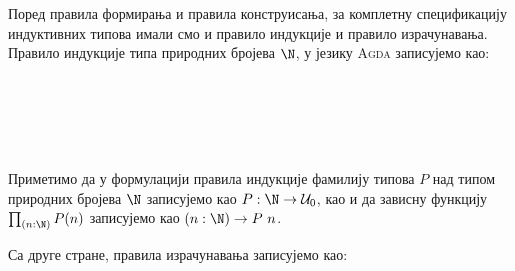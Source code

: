 Поред правила формирања и правила конструисања, за комплетну спецификацију индуктивних типова имали смо и правило индукције и правило израчунавања. Правило индукције типа природних бројева $\N$, у језику \textsc{Agda} записујемо као:
\begin{code} %
\>[0]%
\>[29I]\AgdaSymbol{:}\AgdaSpace{}%
\AgdaSymbol{(}\AgdaSpace{}%
\AgdaSymbol{:}\AgdaSpace{}%
\AgdaSpace{}%
\AgdaSpace{}%
\AgdaSpace{}%
\AgdaSpace{}%
\AgdaSymbol{)}\<%
\\
\>[.][@{}l@{}]\<[29I]%
\>[12]\AgdaSpace{}%
\AgdaSpace{}%
\<%
\\
%
\>[12]\AgdaSpace{}%
\AgdaSymbol{((}\AgdaSpace{}%
\AgdaSymbol{:}\AgdaSpace{}%
\AgdaSymbol{)}\AgdaSpace{}%
\AgdaSpace{}%
\AgdaSpace{}%
\AgdaSpace{}%
\AgdaSpace{}%
\AgdaSpace{}%
\AgdaSymbol{(}\AgdaSpace{}%
\AgdaSymbol{))}\<%
\\
%
\>[12]\AgdaSpace{}%
\AgdaSymbol{(}\AgdaSpace{}%
\AgdaSymbol{:}\AgdaSpace{}%
\AgdaSymbol{)}\AgdaSpace{}%
\AgdaSpace{}%
\AgdaSpace{}%
\<%
\\
\>[0]\<%
\end{code}

Приметимо да у формулацији правила индукције фамилију типова $P$ над типом природних бројева $\N$ записујемо као $P : \N \to \mathcal{U}_0$, као и да зависну функцију $\prod_{(n : \N)} P (n)$ записујемо као $(n : \N) \to P~n$.

Са друге стране, правила израчунавања записујемо као:
\begin{code}%
\>[0]\AgdaSpace{}%
\AgdaSpace{}%
\AgdaSpace{}%
\AgdaSpace{}%
%
\>[29]\AgdaSymbol{=}\AgdaSpace{}%
\<%
\\
\>[0]\AgdaSpace{}%
\AgdaSpace{}%
\AgdaSpace{}%
\AgdaSpace{}%
\AgdaSymbol{(}\AgdaSpace{}%
\AgdaSymbol{)}\AgdaSpace{}%
\AgdaSymbol{=}\AgdaSpace{}%
\AgdaSpace{}%
\AgdaSpace{}%
\AgdaSymbol{(}\AgdaSpace{}%
\AgdaSpace{}%
\AgdaSpace{}%
\AgdaSpace{}%
\AgdaSymbol{)}\<%
\end{code}

